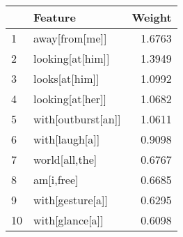 \begin{tabular}{llr}
\toprule
{} &             Feature &  Weight \\
\midrule
1  &      away[from[me]] &  1.6763 \\
2  &    looking[at[him]] &  1.3949 \\
3  &      looks[at[him]] &  1.0992 \\
4  &    looking[at[her]] &  1.0682 \\
5  &  with[outburst[an]] &  1.0611 \\
6  &      with[laugh[a]] &  0.9098 \\
7  &      world[all,the] &  0.6767 \\
8  &          am[i,free] &  0.6685 \\
9  &    with[gesture[a]] &  0.6295 \\
10 &     with[glance[a]] &  0.6098 \\
\bottomrule
\end{tabular}
